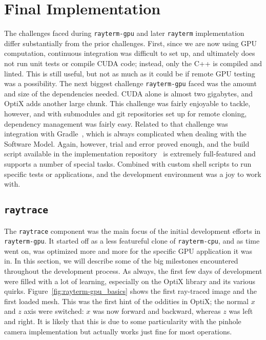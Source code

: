 \section{Final Implementation}\label{ch:implementation:final}

The challenges faced during \texttt{rayterm-gpu} and later \texttt{rayterm} implementation differ substantially from the prior challenges.
First, since we are now using GPU computation, continuous integration was difficult to set up, and ultimately does not run unit tests or compile CUDA code; instead, only the C++ is compiled and linted.
This is still useful, but not as much as it could be if remote GPU testing was a possibility.
The next biggest challenge \texttt{rayterm-gpu} faced was the amount and size of the dependencies needed.
CUDA alone is almost two gigabytes, and OptiX adds another large chunk.
This challenge was fairly enjoyable to tackle, however, and with submodules and git repositories set up for remote cloning, dependency management was fairly easy.
Related to that challenge was integration with Gradle~\cite{gradle}, which is always complicated when dealing with the Software Model.
Again, however, trial and error proved enough, and the build script available in the \name{} implementation repository~\cite{raytermGpuImpl} is extremely full-featured and supports a number of special tasks.
Combined with custom shell scripts to run specific tests or applications, and the development environment was a joy to work with.


\subsection{\texttt{raytrace}}\label{ch:implementation:final:raytrace}

The \texttt{raytrace} component was the main focus of the initial development efforts in \texttt{rayterm-gpu}.
It started off as a less featureful clone of \texttt{rayterm-cpu}, and as time went on, was optimized more and more for the specific GPU application it was in.
In this section, we will describe some of the big milestones encountered throughout the development process.
As always, the first few days of development were filled with a lot of learning, especially on the OptiX library and its various quirks.
Figure~\ref{fig:rayterm-gpu_basics} shows the first ray-traced image and the first loaded mesh.
This was the first hint of the oddities in OptiX; the normal $x$ and $z$ axis were switched: $x$ was now forward and backward, whereas $z$ was left and right.
It is likely that this is due to some particularity with the pinhole camera implementation but actually works just fine for most operations.

